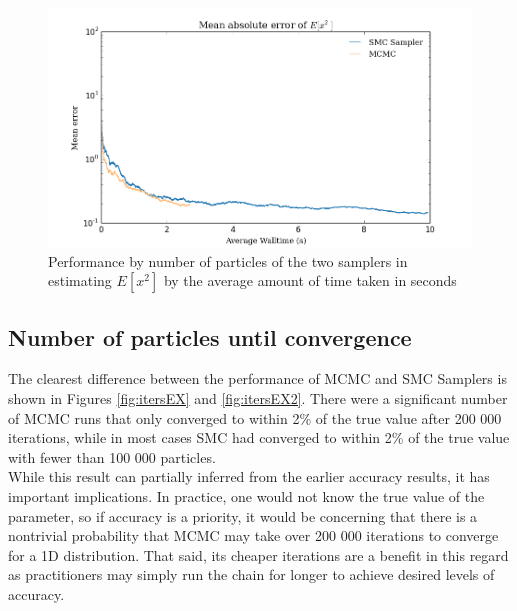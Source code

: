 \documentclass[12pt]{elsarticle}
\begin{document}
\begin{figure}[htbp]
\begin{center}
\includegraphics[width = \textwidth]{plots/E_X2_walltime.png}
\caption{Performance by number of particles of the two samplers in estimating $E[x^2]$ by the average amount of time taken in seconds}
\label{walltime_ex2}
\end{center}
\end{figure}

\subsection*{Number of particles until convergence }

The clearest difference between the performance of MCMC and SMC Samplers is shown in Figures \ref{fig:itersEX} and \ref{fig:itersEX2}. There were a significant number of MCMC runs that only converged to within 2\% of the true value after 200 000 iterations, while in most cases SMC had converged to within 2\% of the true value with fewer than 100 000 particles. \\ 

While this result can partially inferred from the earlier accuracy results, it has important implications. In practice, one would not know the true value of the parameter, so if accuracy is a priority, it would be concerning that there is a nontrivial probability that MCMC may take over 200 000 iterations to converge for a 1D distribution.  That said, its cheaper iterations are a benefit in this regard as practitioners may simply run the chain for longer to achieve desired levels of accuracy.
\end{document}
